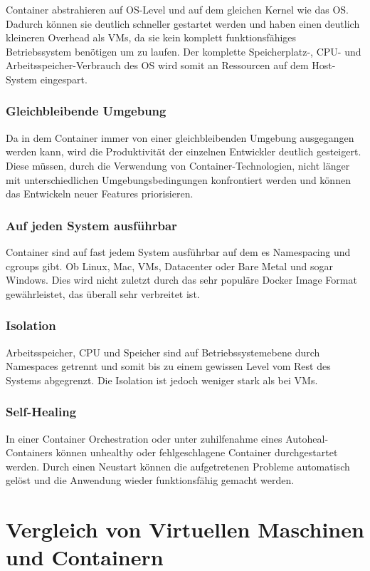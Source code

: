 Container abstrahieren auf \ac{OS}-Level und auf dem gleichen Kernel wie das \ac{OS}.
Dadurch können sie deutlich schneller gestartet werden und haben einen deutlich kleineren Overhead als \ac{VM}s, da sie kein komplett funktionsfähiges Betriebssystem benötigen um zu laufen.
Der komplette Speicherplatz-, \ac{CPU}- und Arbeitsspeicher-Verbrauch des \ac{OS} wird somit an Ressourcen auf dem Host-System eingespart.

\subsubsection{Gleichbleibende Umgebung}
Da in dem Container immer von einer gleichbleibenden Umgebung ausgegangen werden kann, wird die Produktivität der einzelnen Entwickler deutlich gesteigert.
Diese müssen, durch die Verwendung von Container-Technologien, nicht länger mit unterschiedlichen Umgebungsbedingungen konfrontiert werden und können das Entwickeln neuer Features priorisieren.

\subsubsection{Auf jeden System ausführbar}
Container sind auf fast jedem System ausführbar auf dem es Namespacing und cgroups gibt. 
Ob Linux, Mac, \ac{VM}s, Datacenter oder Bare Metal und sogar Windows.
Dies wird nicht zuletzt durch das sehr populäre Docker Image Format gewährleistet, das überall sehr verbreitet ist. 

\subsubsection{Isolation}
Arbeitsspeicher, \ac{CPU} und Speicher sind auf Betriebssystemebene durch Namespaces getrennt und somit bis zu einem gewissen Level vom Rest des Systems abgegrenzt.
Die Isolation ist jedoch weniger stark als bei \ac{VM}s.

\subsubsection{Self-Healing}
In einer Container Orchestration oder unter zuhilfenahme eines Autoheal-Containers können unhealthy oder fehlgeschlagene Container durchgestartet werden.
Durch einen Neustart können die aufgetretenen Probleme automatisch gelöst und die Anwendung wieder funktionsfähig gemacht werden. 


\section{Vergleich von Virtuellen Maschinen und Containern}


